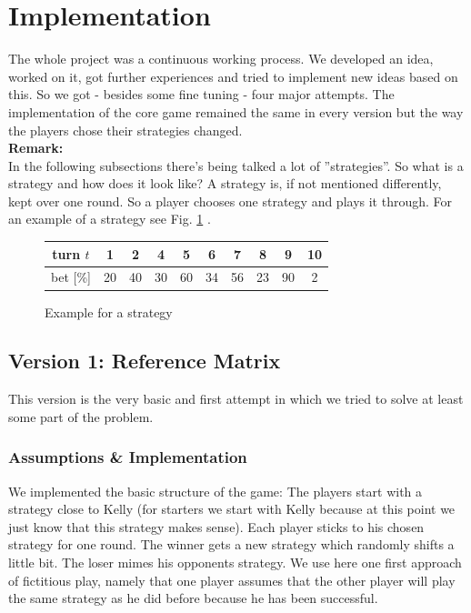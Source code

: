 \documentclass[11pt]{article}
\begin{document}
\section{Implementation}
The whole project was a continuous working process. We developed an idea, worked on it, got further experiences and tried to implement new ideas based on this. So we got - besides some fine tuning - four major attempts.
The implementation of the core game remained the same in every version but the way the players chose their strategies changed.\\
\textbf{Remark:}\\
In the following subsections there's being talked a lot of ''strategies''. So what is a strategy and how does it look like? A strategy is, if not mentioned differently, kept over one round. So a player chooses one strategy and plays it through. For an example of a strategy see Fig. \ref{strategy example} .
\begin{figure}[h]
	\centering
	\begin{tabular}{|c|c|c|c|c|c|c|c|c|c|}
	\hline
	turn $t$ & 1 & 2 & 4 & 5 & 6 & 7 & 8 & 9 & 10\\
	\hline
	bet [\%] & 20 & 40 & 30 & 60 & 34 & 56 & 23 & 90 & 2\\
	\hline
	\end{tabular}
	\caption{Example for a strategy}
	\label{strategy example}
\end{figure} 

\subsection{Version 1: Reference Matrix}
This version is the very basic and first attempt in which we tried to solve at least some part of the problem.

\subsubsection{Assumptions \& Implementation}
We implemented the basic structure of the game: The players start with a strategy close to Kelly (for starters we start with Kelly because at this point we just know that this strategy makes sense). Each player sticks to his chosen strategy for one round. The winner gets a new strategy which randomly shifts a little bit. The loser mimes his opponents strategy. We use here one first approach of fictitious play, namely that one player assumes that the other player will play the same strategy as he did before because he has been successful.
\end{document}
